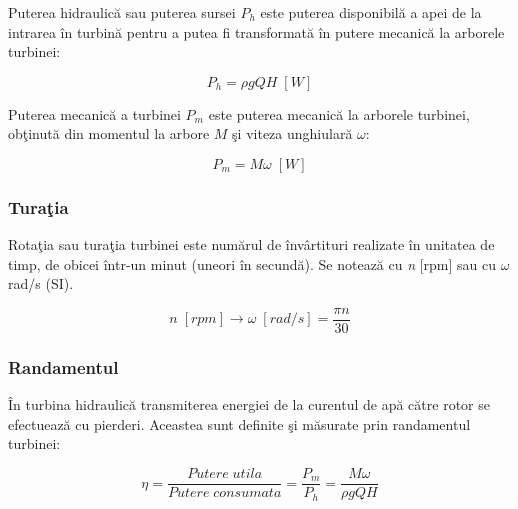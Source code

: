 Puterea hidraulic\u{a} sau puterea sursei $P_h$ este puterea disponibil\u{a} a apei de la intrarea \^{i}n turbin\u{a} pentru a putea fi transformat\u{a} \^{i}n putere mecanic\u{a} la arborele turbinei:

\begin{equation}
P_h={\rho}gQH\; [\si{W}]
\end{equation}

Puterea mecanic\u{a} a turbinei $P_m$ este puterea mecanic\u{a} la arborele turbinei, ob\c{t}inut\u{a} din momentul la arbore $M$ \c{s}i viteza unghiular\u{a} $\omega$:

\begin{equation}
P_m=M{\omega}\; [\si{W}]
\end{equation}

\subsubsection{Tura\c{t}ia}

Rota\c{t}ia sau tura\c{t}ia turbinei este num\u{a}rul de \^{i}nv\^{a}rtituri realizate \^{i}n unitatea de timp, de obicei \^{i}ntr-un minut (uneori \^{i}n secund\u{a}). Se noteaz\u{a} cu \textit{n} [rpm] sau cu \(\omega\) rad/s (SI).

\begin{equation}
n\; [\si{rpm}]\rightarrow{\omega}\; [\si{rad/s}]=\frac{{\pi}n}{30}
\end{equation}


\subsubsection{Randamentul}

\^{I}n turbina hidraulic\u{a} transmiterea energiei de la curentul de ap\u{a} c\u{a}tre rotor se efectueaz\u{a} cu pierderi. Aceastea sunt definite \c{s}i m\u{a}surate prin randamentul turbinei:

\begin{equation}
{\eta}=\frac{Putere\; utila}{Putere\; consumata}=\frac{P_m}{P_h}=\frac{M{\omega}}{{\rho}gQH}
\end{equation}

